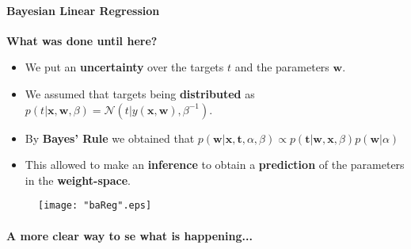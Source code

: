 \begin{frame}{\insertsubsection}
    \framesubtitle{Bayesian Linear Regression} 

    \textcolor{UniGold}{\textbf{What was done until here?}}
    \begin{itemize}
        \item We put an \textcolor{UniOrange}{\textbf{uncertainty}} over the targets $t$ and the parameters $\mathbf{w}$.
        \item We assumed that targets being \textcolor{UniOrange}{\textbf{distributed}} as $p( t| \mathbf{x}, \mathbf{w}, \beta) = \mathcal{N} ( t | y(\mathbf{x}, \mathbf{w}), \beta^{-1})$.
        \item By \textcolor{UniOrange}{\textbf{Bayes' Rule}} we obtained that $p\left( \mathbf{w} | \mathbf{x}, \mathbf{t}, \alpha, \beta \right) \propto p\left(  \mathbf{t} |\mathbf{w} ,\mathbf{x}, \beta \right) p\left( \mathbf{w} | \alpha \right)$
        \item This allowed to make an \textcolor{UniOrange}{\textbf{inference}} to obtain a \textcolor{UniOrange}{\textbf{prediction}} of the parameters in the \textcolor{UniOrange}{\textbf{weight-space}}.
        
    \end{itemize}

    \begin{figure}
		\label{fig:baReg}
        \hspace*{-1.4cm}\texttt{[image: "baReg".eps]}
	\end{figure}
\end{frame}


\begin{frame}{\insertsubsection}
    \framesubtitle{A more clear way to se what is happening...} 


\end{frame}


